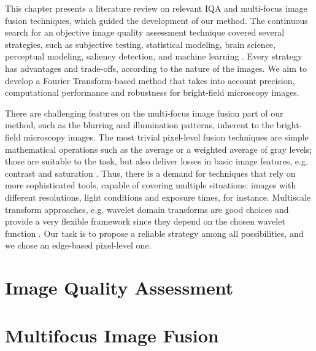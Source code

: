 This chapter presents a literature review on relevant IQA and multi-focus image fusion techniques, which guided the development of our method. The continuous search for an objective image quality assessment technique covered several strategies, such as subjective testing, statistical modeling, brain science, perceptual modeling, saliency detection, and machine learning \cite{tang2019feature}. Every strategy has advantages and trade-offs, according to the nature of the images. We aim to develop a Fourier Transform-based method that takes into account precision, computational performance and robustness for bright-field microscopy images.

There are challenging features on the multi-focus image fusion part of our method, such as the blurring and illumination patterns, inherent to the bright-field microscopy images. The most trivial pixel-level fusion techniques are simple mathematical operations such as the average or a weighted average of gray levels; those are suitable to the task, but also deliver losses in basic image features, e.g. contrast and saturation \cite{zhang2009multifocus}. Thus, there is a demand for techniques that rely on more sophisticated tools, capable of covering multiple situations: images with different resolutions, light conditions and exposure times, for instance. Multiscale transform approaches, e.g. wavelet domain transforms are good choices and provide a very flexible framework since they depend on the chosen wavelet function \cite{pajares2004wavelet}. Our task is to propose a reliable strategy among all possibilities, and we chose an edge-based pixel-level one.

\section{Image Quality Assessment}


\section{Multifocus Image Fusion}
